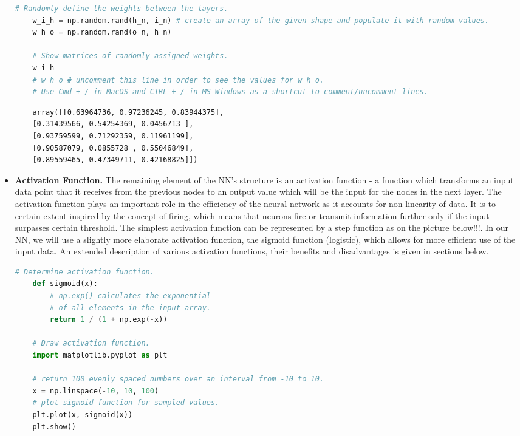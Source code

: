 \begin{itemize}
\begin{lstlisting}[language=Python]
    # Randomly define the weights between the layers. 
    w_i_h = np.random.rand(h_n, i_n) # create an array of the given shape and populate it with random values.
    w_h_o = np.random.rand(o_n, h_n) 
    
    # Show matrices of randomly assigned weights.
    w_i_h
    # w_h_o # uncomment this line in order to see the values for w_h_o.
    # Use Cmd + / in MacOS and CTRL + / in MS Windows as a shortcut to comment/uncomment lines.
\end{lstlisting}

\begin{lstlisting}
    array([[0.63964736, 0.97236245, 0.83944375],
    [0.31439566, 0.54254369, 0.0456713 ],
    [0.93759599, 0.71292359, 0.11961199],
    [0.90587079, 0.0855728 , 0.55046849],
    [0.89559465, 0.47349711, 0.42168825]])
\end{lstlisting}

\item \textbf{Activation Function.} The remaining element of the NN's structure is an activation function - a function which transforms an input data point that it receives from the previous nodes to an output value which will be the input for the nodes in the next layer. The activation function plays an important role in the efficiency of the neural network as it accounts for non-linearity of data. 
It is to certain extent inspired by the concept of firing, which means that neurons fire or transmit information further only if the input surpasses certain threshold. The simplest activation function can be represented by a step function as on the picture below!!!. In our NN, we will use a slightly more elaborate activation function, the sigmoid function (logistic), which allows for more efficient use of the input data. An extended description of various activation functions, their benefits and disadvantages is given in sections below.

\begin{lstlisting}[language=Python]
    # Determine activation function.
    def sigmoid(x):
        # np.exp() calculates the exponential
        # of all elements in the input array.
        return 1 / (1 + np.exp(-x)) 

    # Draw activation function.
    import matplotlib.pyplot as plt
    
    # return 100 evenly spaced numbers over an interval from -10 to 10.
    x = np.linspace(-10, 10, 100) 
    # plot sigmoid function for sampled values.
    plt.plot(x, sigmoid(x)) 
    plt.show()
\end{lstlisting}

\end{itemize}


